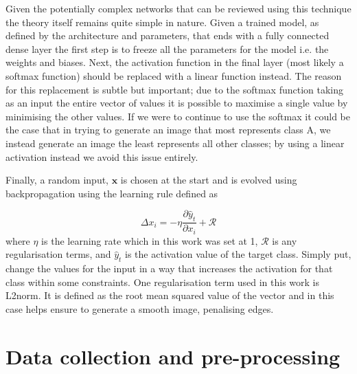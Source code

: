 \documentclass[12pt]{article}
\numberwithin{equation}{section}
\numberwithin{figure}{section}
\begin{document}
Given the potentially complex networks that can be reviewed using this technique the theory itself remains quite simple in nature. Given a trained model, as defined by the architecture and parameters, that ends with a fully connected dense layer the first step is to freeze all the parameters for the model i.e. the weights and biases. Next, the activation function in the final layer (most likely a softmax function) should be replaced with a linear function instead. The reason for this replacement is subtle but important; due to the softmax function taking as an input the entire vector of values it is possible to maximise a single value by minimising the other values. If we were to continue to use the softmax it could be the case that in trying to generate an image that most represents class A, we instead generate an image the least represents all other classes; by using a linear activation instead we avoid this issue entirely.

Finally, a random input, $\bm{x}$ is chosen at the start and is evolved using backpropagation using the learning rule defined as

\begin{equation}
	\label{eq:act_max}
	\Delta x_i = -\eta\frac{\partial \hat{y}_t}{\partial x_i} + \mathcal{R}
\end{equation}
where $\eta$ is the learning rate which in this work was set at 1, $\mathcal{R}$ is any regularisation terms, and $\hat{y}_t$ is the activation value of the target class. Simply put, change the values for the input in a way that increases the activation for that class within some constraints. One regularisation term used in this work is L2norm. It is defined as the root mean squared value of the vector and in this case helps ensure to generate a smooth image, penalising edges.
\section{Data collection and pre-processing} 
\label{sec:Data_collection_and_pre-processing} 
\end{document}
